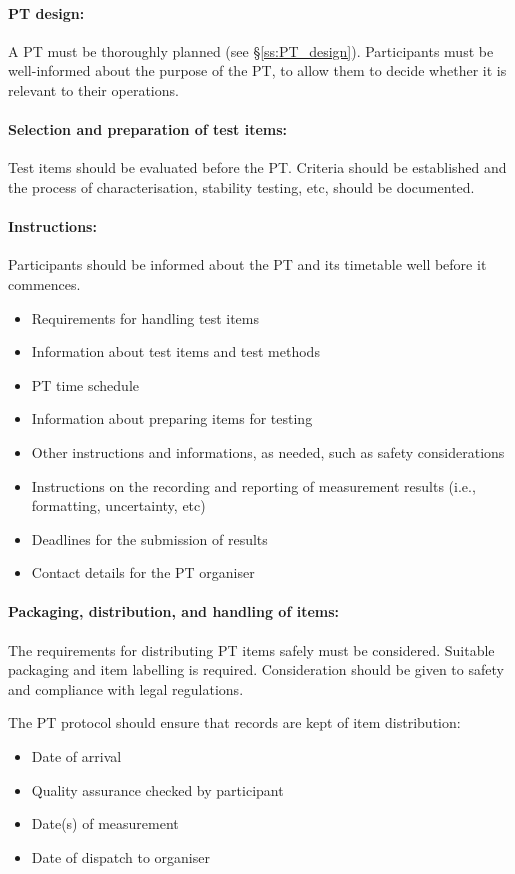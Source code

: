 \paragraph{PT design: }
A PT must be thoroughly planned (see \S\ref{ss:PT_design}). Participants must be well-informed about the purpose of the PT, to allow them to decide whether it is relevant to their operations.

\paragraph{Selection and preparation of test items:}
Test items should be evaluated before the PT. Criteria should be established and the process of characterisation, stability testing, etc, should be documented. 

\paragraph{Instructions:}
Participants should be informed about the PT and its timetable well before it commences. 

\begin{itemize}
	\item Requirements for handling test items
	\item Information about test items and test methods
	\item PT time schedule
	\item Information about preparing items for testing
	\item Other instructions and informations, as needed, such as safety considerations
	\item Instructions on the recording and reporting of measurement results (i.e., formatting, uncertainty, etc)
	\item Deadlines for the submission of results
	\item Contact details for the PT organiser
\end{itemize}

\paragraph{Packaging, distribution, and handling of items:}
The requirements for distributing PT items safely must be considered. Suitable packaging and item labelling is required. Consideration should be given to safety and compliance with legal regulations. 

The PT protocol should ensure that records are kept of item distribution: 
\begin{itemize}
	\item Date of arrival
	\item Quality assurance checked by participant
	\item Date(s) of measurement
	\item Date of dispatch to organiser
\end{itemize}
 
